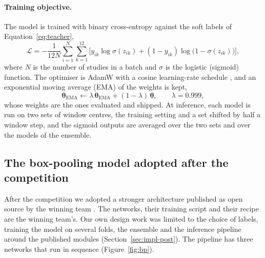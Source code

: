 \paragraph{Training objective.} The model is trained with binary cross-entropy against the soft labels of Equation~\eqref{eq:teacher},
\begin{equation}
\mathcal L = -\frac{1}{12N}\sum_{i=1}^{N}\sum_{k=1}^{12}\Big[y_{ik}\log\sigma(z_{ik}) + (1-y_{ik})\log\big(1-\sigma(z_{ik})\big)\Big],
\label{eq:bce}
\end{equation}
where $N$ is the number of studies in a batch and $\sigma$ is the logistic (sigmoid) function. The optimiser is AdamW \cite{loshchilov2019adamw} with a cosine learning-rate schedule \cite{loshchilov2017sgdr}, and an exponential moving average (EMA) of the weights is kept,
\begin{equation}
\boldsymbol\theta_{\text{EMA}} \leftarrow \lambda\,\boldsymbol\theta_{\text{EMA}} + (1-\lambda)\,\boldsymbol\theta, \qquad \lambda = 0.999 ,
\label{eq:ema}
\end{equation}
whose weights are the ones evaluated and shipped. At inference, each model is run on two sets of window centres, the training setting and a set shifted by half a window step, and the sigmoid outputs are averaged over the two sets and over the models of the ensemble.

\subsection{The box-pooling model adopted after the competition}
\label{sec:design-bp}

After the competition we adopted a stronger architecture published as open source by the winning team \cite{tascj_boxpool,tascj_roidetector,tascj_sideclassifier}. The networks, their training script and their recipe are the winning team's. Our own design work was limited to the choice of labels, training the model on several folds, the ensemble and the inference pipeline around the published modules (Section~\ref{sec:impl-post}). The pipeline has three networks that run in sequence (Figure~\ref{fig:bp}).

